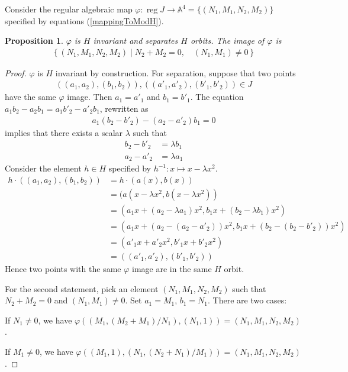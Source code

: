 \documentclass[12pt]{article}
\numberwithin{equation}{section}
\theoremstyle{plain}
\newtheorem{proposition}[definition]{Proposition}
\theoremstyle{definition}
\newcommand{\ra}{\rightarrow}
\newcommand{\A}{\mathbb{A}}
\begin{document}
Consider the regular algebraic map $\varphi:\operatorname{reg}J\ra \A^{4}=\{(N_1,M_1,N_2,M_2)\}$ specified by equations (\ref{mappingToModH}).
\begin{proposition}\label{2sep} $\varphi$ is $H$ invariant and separates $H$ orbits. The image of $\varphi$ is
\begin{align*}
\left\{ (N_1,M_1,N_2,M_2)  \mathrel{}\middle|\mathrel{} N_2+M_2=0, \quad(N_1,M_1)\neq 0\right\}
\end{align*}
\end{proposition}
\begin{proof} $\varphi$ is $H$ invariant by construction. For separation, suppose that two points
\begin{align*}
((a_1,a_2),(b_1,b_2)),((a'_1,a'_2),(b'_1,b'_2))\in J
\end{align*}
have the same $\varphi$ image. Then $a_1=a'_1$ and $b_1=b'_1$. The equation $a_1b_2-a_2b_1 = a_1b'_2-a'_2b_1$, rewritten as
\begin{align*}
a_1(b_2-b'_2)-(a_2-a'_2)b_1=0
\end{align*}
implies that there exists a scalar $\lambda$ such that
\begin{align*}
b_2-b'_2&=\lambda b_1\\
a_2-a'_2&=\lambda a_1
\end{align*}
Consider the element $h\in H$ specified by $h^{-1}:x\mapsto x-\lambda x^{2}$.
\begin{align*}
h\cdot ((a_1,a_2),(b_1,b_2)) &= h\cdot (a(x),b(x))\\
                             &= (a(x-\lambda x^{2},b(x-\lambda x^{2}))\\
                             &= (a_1x+(a_2-\lambda a_1)x^{2},b_1x+(b_2-\lambda b_1)x^{2})\\
                             &= (a_1x+(a_2-(a_2-a'_2))x^{2},b_1x+(b_2-(b_2-b'_2))x^{2})\\
                             &= (a'_1x+a'_2x^{2},b'_1x+b'_2x^{2})\\
                             &= ((a'_1,a'_2),(b'_1,b'_2))
\end{align*}
Hence two points with the same $\varphi$ image are in the same $H$ orbit.

For the second statement, pick an element $(N_1,M_1,N_2,M_2)$ such that $N_2+M_2=0$ and $(N_1,M_1)\neq 0$. Set $a_1=M_1$, $b_1=N_1$. There are two cases:

If $N_1\neq 0$, we have $\varphi((M_1,(M_2+M_1)/N_1),(N_1,1))=(N_1,M_1,N_2,M_2)$.

If $M_1\neq 0$, we have $\varphi((M_1,1),(N_1,(N_2+N_1)/M_1))=(N_1,M_1,N_2,M_2)$.
\end{proof}
\end{document}
